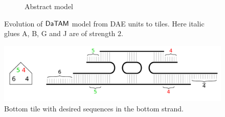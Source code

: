 \begin{figure}[H]
\begin{center}
\begin{subfigure}[b]{0.190\textwidth}
		\caption{Abstract model}
		\label{fig:abstract_model}
	\end{subfigure}
	\caption{Evolution of $\mathsf{DaTAM}$ model from DAE units to tiles. Here italic glues {\sf A}, {\sf B}, {\sf G} and {\sf J} are of strength $2$.} %
	\label{fig:evolution}
\end{center}
\end{figure}

\begin{figure}[H]
\begin{center}
	\includegraphics[scale=0.75]{./figures/3-color/bottom_tile.pdf}
	\caption{Bottom tile with desired sequences in the bottom strand.}
	\label{fig:bottom_tile}
\end{center}
\end{figure}
